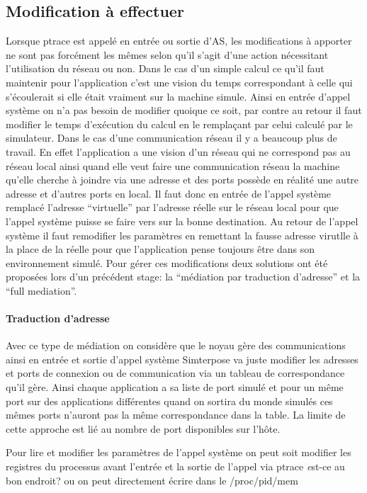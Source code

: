 \subsection{Modification à effectuer}
Lorsque ptrace est appelé en entrée ou sortie d'AS, les modifications à apporter ne sont pas forcément les mêmes selon qu'il s'agit d'une action nécessitant l'utilisation du réseau ou non. Dans le cas d'un simple calcul ce qu'il faut maintenir pour l'application c'est une vision du temps correspondant à celle qui s'écoulerait si elle était vraiment sur la machine simule. Ainsi en entrée d'appel système on n'a pas besoin de modifier quoique ce soit, par contre au retour il faut modifier le temps d'exécution du calcul en le remplaçant par celui calculé par le simulateur. Dans le cas d'une communication réseau il y a beaucoup plus de travail. En effet l'application a une vision d'un réseau qui ne correspond pas au réseau local ainsi quand elle veut faire une communication réseau la machine qu'elle cherche à joindre via une adresse et des ports possède en réalité une autre adresse et d'autres ports en local. Il faut donc en entrée de l'appel système remplacé l'adresse ``virtuelle'' par l'adresse réelle sur le réseau local pour que l'appel système puisse se faire vers sur la bonne destination. Au retour de l'appel système il faut remodifier les paramètres en remettant la fausse adresse virutlle à la place de la réelle pour que l'application pense toujours être dans son environnement simulé. Pour gérer ces modifications deux solutions ont été proposées lors d'un précédent stage: la  ``médiation par traduction d'adresse'' et la ``full mediation''.
\paragraph{Traduction d'adresse} Avec ce type de médiation on considère que le noyau gère des communications ainsi en entrée et sortie d'appel système Simterpose va juste modifier les adresses et ports de connexion ou de communication via un tableau de correspondance qu'il gère. Ainsi chaque application a sa liste de port simulé et pour un même port sur des applications différentes quand on sortira du monde simulés ces mêmes ports n'auront pas la même correspondance dans la table. La limite de cette approche est lié au nombre de port disponibles sur l'hôte.

{\color{green} Pour lire et modifier les paramètres de l'appel système on peut soit modifier les registres du processus avant l'entrée et la sortie de l'appel via ptrace \textit est-ce au bon endroit?} {\color{red}ou on peut directement écrire dans le /proc/pid/mem}
